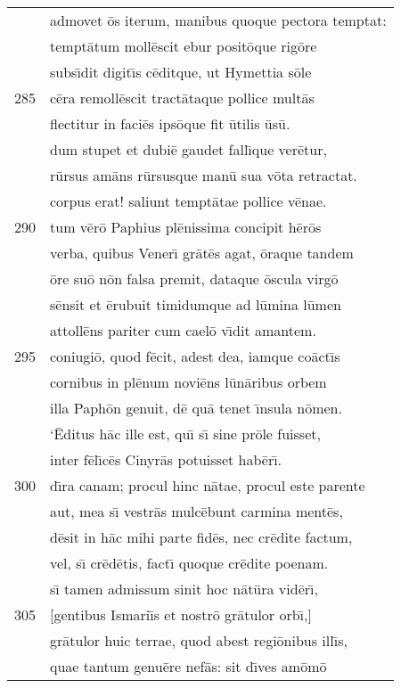 \documentclass[paper=6in:9in,pagesize=pdftex,
               headinclude=on,footinclude=on,12pt]{scrbook}
\begin{document}
\begin{longtable}[p]{ r l }
 & admovet \=os iterum, manibus quoque pectora temptat:\\ 
 & tempt\=atum moll\=escit ebur posit\=oque rig\=ore\\ 
 & subs\={\i}dit digit\={\i}s c\=editque, ut Hymettia s\=ole\\ 
285 & c\=era remoll\=escit tract\=ataque pollice mult\=as\\ 
 & flectitur in faci\=es ips\=oque fit \=utilis \=us\=u.\\ 
 & dum stupet et dubi\=e gaudet fall\={\i}que ver\=etur,\\ 
 & r\=ursus am\=ans r\=ursusque man\=u sua v\=ota retractat.\\ 
 & corpus erat! saliunt tempt\=atae pollice v\=enae.\\ 
290 & tum v\=er\=o Paphius pl\=enissima concipit h\=er\=os\\ 
 & verba, quibus Vener\={\i} gr\=at\=es agat, \=oraque tandem\\ 
 & \=ore su\=o n\=on falsa premit, dataque \=oscula virg\=o\\ 
 & s\=ensit et \=erubuit timidumque ad l\=umina l\=umen\\ 
 & attoll\=ens pariter cum cael\=o v\={\i}dit amantem.\\ 
295 & coniugi\=o, quod f\=ecit, adest dea, iamque co\=act\={\i}s\\ 
 & cornibus in pl\=enum novi\=ens l\=un\=aribus orbem\\ 
 & illa Paph\=on genuit, d\=e qu\=a tenet \={\i}nsula n\=omen.\\ 
 & \indent `\=Editus h\=ac ille est, qu\={\i} s\={\i} sine pr\=ole fuisset,\\ 
 & inter f\=el\={\i}c\=es Cinyr\=as potuisset hab\=er\={\i}.\\ 
300 & d\={\i}ra canam; procul hinc n\=atae, procul este parente\\ 
 & aut, mea s\={\i} vestr\=as mulc\=ebunt carmina ment\=es,\\ 
 & d\=esit in h\=ac mihi parte fid\=es, nec cr\=edite factum,\\ 
 & vel, s\={\i} cr\=ed\=etis, fact\={\i} quoque cr\=edite poenam.\\ 
 & s\={\i} tamen admissum sinit hoc n\=at\=ura vid\=er\={\i},\\ 
305 & [gentibus Ismari\={\i}s et nostr\=o gr\=atulor orb\={\i},]\\ 
 & gr\=atulor huic terrae, quod abest regi\=onibus ill\={\i}s,\\ 
 & quae tantum genu\=ere nef\=as: sit d\={\i}ves am\=om\=o\\ 

\end{longtable}
\end{document}
